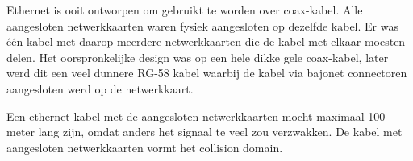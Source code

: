 Ethernet is ooit ontworpen om gebruikt te worden over coax-kabel. Alle aangesloten netwerkkaarten waren fysiek aangesloten op dezelfde kabel. Er was \'e\'en kabel met daarop meerdere netwerkkaarten die de kabel met elkaar moesten delen. Het oorspronkelijke design was op een hele dikke gele coax-kabel, later werd dit een veel dunnere RG-58 kabel waarbij de kabel via bajonet connectoren aangesloten werd op de netwerkkaart.

Een ethernet-kabel met de aangesloten netwerkkaarten mocht maximaal 100 meter lang zijn, omdat anders het signaal te veel zou verzwakken. De kabel met aangesloten netwerkkaarten vormt het collision domain.

